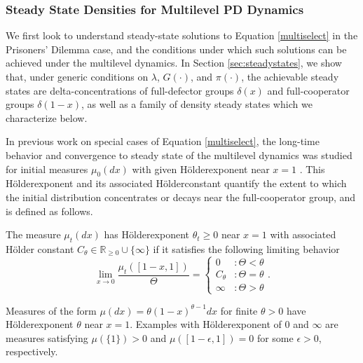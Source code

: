 \documentclass[11pt]{article}
\numberwithin{equation}{section}
\newcommand{\RR}{\mathbb{R}}
\newcommand{\holder}{H{\"o}lder\:}
\begin{document}
{\subsubsection{Steady State Densities for Multilevel PD Dynamics}
\label{sec:steadystatesummary}

 We first look to understand steady-state solutions to Equation \eqref{multiselect} in the Prisoners' Dilemma case, and the conditions under which such solutions can be achieved under the multilevel dynamics. In Section \ref{sec:steadystates}, we show that, under generic conditions on $\lambda$, $G(\cdot)$, and $\pi(\cdot)$, the achievable steady states are delta-concentrations of full-defector groups $\delta(x)$ and full-cooperator groups $\delta(1-x)$, as well as a family of density steady states which we characterize below. 

In previous work on special cases of Equation \eqref{multiselect}, the long-time behavior and convergence to steady state of the multilevel dynamics was studied for initial measures $\mu_0(dx)$ with given \holder exponent near $x=1$ \cite{luo2017scaling,cooney2019replicator,cooney2020analysis}. This \holder exponent and its associated \holder constant quantify the extent to which the initial distribution concentrates or decays near the full-cooperator group, and is defined as follows.

\begin{definition} \label{def:holderexponent}
The measure $\mu_t(dx)$ has \holder exponent $\theta_t \geq 0$ near $x =1$ with associated H{\"o}lder constant $C_{\theta}  \in \RR_{\geq 0} \cup \{ \infty \}$ if it satisfies the following limiting behavior
\begin{equation} \label{eq:holderexponent}
    \lim_{x \to 0} \frac{\mu_t\left([1-x,1]\right)}{\Theta} = 
    \left\{
     \begin{array}{lr}
       0 & : \Theta < \theta \\
       C_{\theta} & : \Theta =  \theta \\
       \infty & : \Theta > \theta
     \end{array}
   \right. .
\end{equation}
\end{definition}
Measures of the form $\mu(dx) = \theta (1-x)^{\theta -1} dx$ for finite $\theta > 0$ have \holder exponent $\theta$ near $x=1$. Examples with \holder exponent of $0$ and $\infty$ are measures satisfying $\mu(\{1\}) > 0$ and $\mu\left([1-\epsilon,1]\right) = 0$ for some $\epsilon > 0$, respectively.


}
\end{document}
